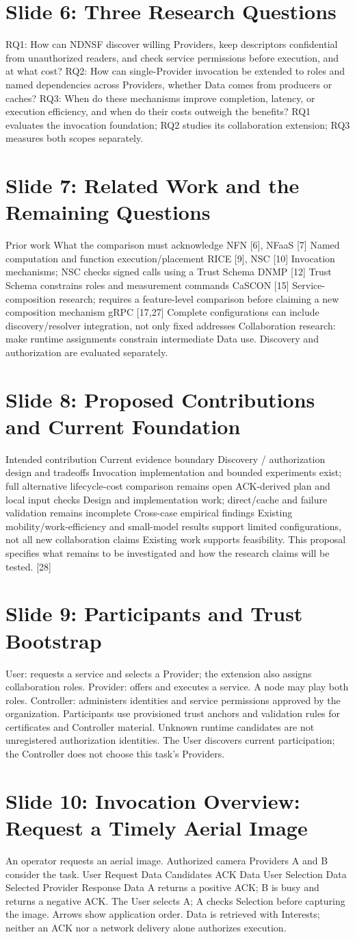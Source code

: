 \documentclass[11pt]{article}
\newcommand{\slideentry}[3]{\section*{Slide #1: #2}#3\par}
\begin{document}
\slideentry{6}{Three Research Questions}{
RQ1: How can NDNSF discover willing Providers, keep descriptors confidential from unauthorized readers, and check service permissions before execution, and at what cost? RQ2: How can single-Provider invocation be extended to roles and named dependencies across Providers, whether Data comes from producers or caches? RQ3: When do these mechanisms improve completion, latency, or execution efficiency, and when do their costs outweigh the benefits? RQ1 evaluates the invocation foundation; RQ2 studies its collaboration extension; RQ3 measures both scopes separately.
}
\slideentry{7}{Related Work and the Remaining Questions}{
Prior work What the comparison must acknowledge NFN [6], NFaaS [7] Named computation and function execution/placement RICE [9], NSC [10] Invocation mechanisms; NSC checks signed calls using a Trust Schema DNMP [12] Trust Schema constrains roles and measurement commands CaSCON [15] Service-composition research; requires a feature-level comparison before claiming a new composition mechanism gRPC [17,27] Complete configurations can include discovery/resolver integration, not only fixed addresses Collaboration research: make runtime assignments constrain intermediate Data use. Discovery and authorization are evaluated separately.
}
\slideentry{8}{Proposed Contributions and Current Foundation}{
Intended contribution Current evidence boundary Discovery / authorization design and tradeoffs Invocation implementation and bounded experiments exist; full alternative lifecycle-cost comparison remains open ACK-derived plan and local input checks Design and implementation work; direct/cache and failure validation remains incomplete Cross-case empirical findings Existing mobility/work-efficiency and small-model results support limited configurations, not all new collaboration claims Existing work supports feasibility. This proposal specifies what remains to be investigated and how the research claims will be tested. [28]
}
\slideentry{9}{Participants and Trust Bootstrap}{
User: requests a service and selects a Provider; the extension also assigns collaboration roles. Provider: offers and executes a service. A node may play both roles. Controller: administers identities and service permissions approved by the organization. Participants use provisioned trust anchors and validation rules for certificates and Controller material. Unknown runtime candidates are not unregistered authorization identities. The User discovers current participation; the Controller does not choose this task’s Providers.
}
\slideentry{10}{Invocation Overview: Request a Timely Aerial Image}{
An operator requests an aerial image. Authorized camera Providers A and B consider the task. User Request Data Candidates ACK Data User Selection Data Selected Provider Response Data A returns a positive ACK; B is busy and returns a negative ACK. The User selects A; A checks Selection before capturing the image. Arrows show application order. Data is retrieved with Interests; neither an ACK nor a network delivery alone authorizes execution.
}
\end{document}
